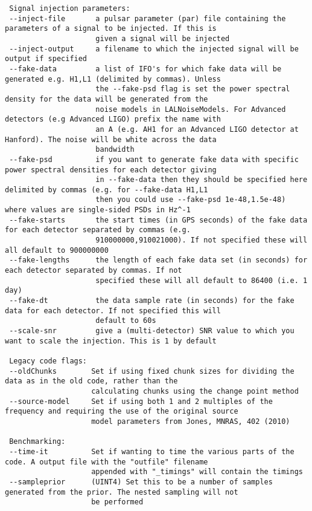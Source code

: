 \begin{footnotesize}
\begin{verbatim}
 Signal injection parameters:
 --inject-file       a pulsar parameter (par) file containing the parameters of a signal to be injected. If this is
                     given a signal will be injected
 --inject-output     a filename to which the injected signal will be output if specified
 --fake-data         a list of IFO's for which fake data will be generated e.g. H1,L1 (delimited by commas). Unless
                     the --fake-psd flag is set the power spectral density for the data will be generated from the
                     noise models in LALNoiseModels. For Advanced detectors (e.g Advanced LIGO) prefix the name with
                     an A (e.g. AH1 for an Advanced LIGO detector at Hanford). The noise will be white across the data
                     bandwidth
 --fake-psd          if you want to generate fake data with specific power spectral densities for each detector giving
                     in --fake-data then they should be specified here delimited by commas (e.g. for --fake-data H1,L1
                     then you could use --fake-psd 1e-48,1.5e-48) where values are single-sided PSDs in Hz^-1
 --fake-starts       the start times (in GPS seconds) of the fake data for each detector separated by commas (e.g.
                     910000000,910021000). If not specified these will all default to 900000000
 --fake-lengths      the length of each fake data set (in seconds) for each detector separated by commas. If not
                     specified these will all default to 86400 (i.e. 1 day)
 --fake-dt           the data sample rate (in seconds) for the fake data for each detector. If not specified this will
                     default to 60s
 --scale-snr         give a (multi-detector) SNR value to which you want to scale the injection. This is 1 by default

 Legacy code flags:
 --oldChunks        Set if using fixed chunk sizes for dividing the data as in the old code, rather than the
                    calculating chunks using the change point method
 --source-model     Set if using both 1 and 2 multiples of the frequency and requiring the use of the original source
                    model parameters from Jones, MNRAS, 402 (2010)

 Benchmarking:
 --time-it          Set if wanting to time the various parts of the code. A output file with the "outfile" filename
                    appended with "_timings" will contain the timings
 --sampleprior      (UINT4) Set this to be a number of samples generated from the prior. The nested sampling will not
                    be performed
\end{verbatim}
\end{footnotesize}

